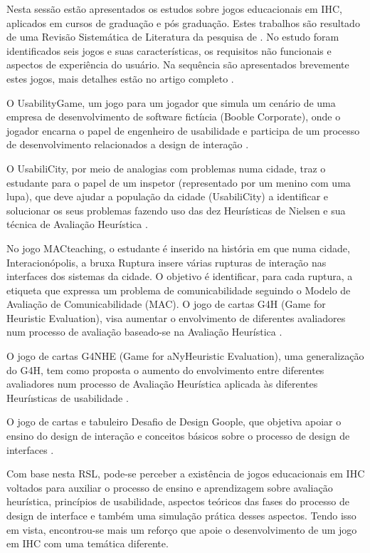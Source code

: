 Nesta sessão estão apresentados os estudos sobre jogos educacionais em IHC, aplicados em cursos de graduação e pós graduação. Estes trabalhos são resultado de uma Revisão Sistemática de Literatura da pesquisa de . No estudo foram identificados seis jogos e suas características, os requisitos não funcionais e aspectos de experiência do usuário. Na sequência são apresentados brevemente estes jogos, mais detalhes estão no artigo completo \cite{deSales_SousaeSilva_2020}.

O UsabilityGame, um jogo para um jogador que simula um cenário de uma empresa de desenvolvimento de software fictíıcia (Booble Corporate), onde o jogador encarna o papel de engenheiro de usabilidade e participa de um processo de desenvolvimento relacionados a design de interação \cite{sommariva}.

O UsabiliCity, por meio de analogias com problemas numa cidade, traz o estudante para o papel de um inspetor (representado por um menino com uma lupa), que deve ajudar a população da cidade (UsabiliCity) a identificar e solucionar os seus problemas fazendo uso das dez Heurísticas de Nielsen e sua técnica de Avaliação Heurística \cite{ferreira2014a, ferreira2014b}.

No jogo MACteaching, o estudante é inserido na história em que numa cidade, Interacionópolis, a bruxa Ruptura insere várias rupturas de interação nas interfaces dos sistemas da cidade. O objetivo é identificar, para cada ruptura, a etiqueta que expressa um problema de comunicabilidade seguindo o Modelo de Avaliação de Comunicabilidade (MAC)\cite{brito, queiroz}.  
O jogo de cartas G4H (Game for Heuristic Evaluation), visa aumentar o envolvimento de diferentes avaliadores num processo de avaliação baseado-se na Avaliação Heurística \cite{juca2017}.

O jogo de cartas G4NHE (Game for aNyHeuristic Evaluation), uma generalização do G4H, tem como proposta o aumento do envolvimento  entre  diferentes  avaliadores  num  processo  de    Avaliação Heurística aplicada às diferentes Heuríısticas de usabilidade \cite{deSousa2019}.

O jogo de cartas e tabuleiro Desafio de Design Goople, que objetiva apoiar o ensino do design de interação e conceitos básicos sobre o processo de design de interfaces \cite{darin}.

Com base nesta RSL, pode-se perceber a existência de jogos educacionais em IHC voltados para auxiliar o processo de ensino e aprendizagem sobre avaliação heurística, princípios de usabilidade, aspectos teóricos das fases do processo de design de interface e também uma simulação prática desses aspectos. Tendo isso em vista, encontrou-se mais um reforço que apoie o desenvolvimento de um jogo em IHC com uma temática diferente.

